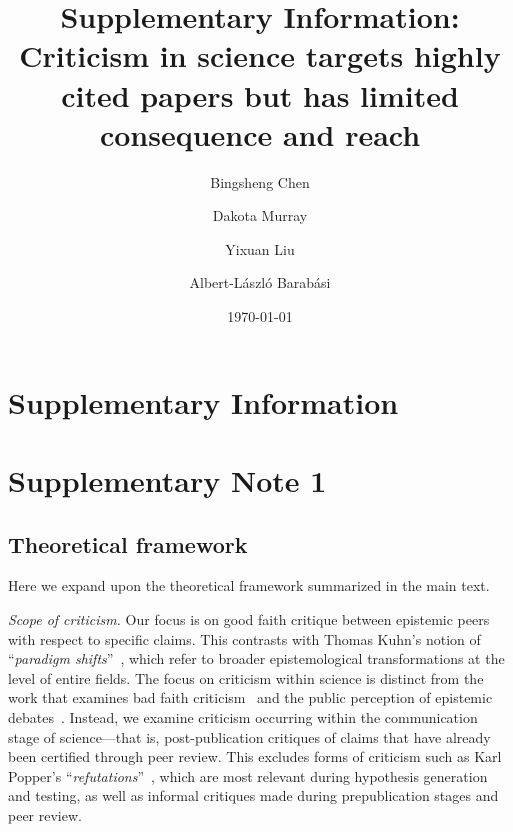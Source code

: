 \documentclass[12pt]{article} %
\newcommand{\beginsupplement}{%
        \setcounter{table}{0}
        \renewcommand{\thetable}{S\arabic{table}}%
        \setcounter{figure}{0}
        \renewcommand{\thefigure}{S\arabic{figure}}%
     }
\begin{document}

\title{Supplementary Information: Criticism in science targets highly cited papers but has limited consequence and reach}

\author[\Yinyang ,a]{Bingsheng Chen}
\author[\Yinyang ,a]{Dakota Murray}
\author[a]{Yixuan Liu}
\author[a,b,c]{Albert-L\'{a}szl\'{o}  Barab\'{a}si }




\date{\today}
\maketitle %

\beginsupplement




%
%
%
\clearpage
\section*{Supplementary Information}
\beginsupplement

%
%

\section*{Supplementary Note 1}
\label{si:text:leydesdorff}
\subsection*{Theoretical framework}
Here we expand upon the theoretical framework summarized in the main text.


\textit{Scope of criticism.}
Our focus is on good faith critique between epistemic peers~\cite{christensen_2007_disagreement} with respect to specific claims. 
This contrasts with Thomas Kuhn's notion of ``\textit{paradigm shifts}''~\cite{kuhn_1962_structure}, which refer to broader epistemological transformations at the level of entire fields.
The focus on criticism within science is distinct from the work that examines bad faith criticism~\cite{oreskes_2010_merchants} and the public perception of epistemic debates~\cite{deroover_2022_experts, lewandowsky_2012_consensus}.
Instead, we examine criticism occurring within the communication stage of science---that is, post-publication critiques of claims that have already been certified through peer review.
This excludes forms of criticism such as Karl Popper’s ``\textit{refutations}''~\cite{popper_logic_1959}, which are most relevant during hypothesis generation and testing, as well as informal critiques made during prepublication stages and peer review.
\end{document}
